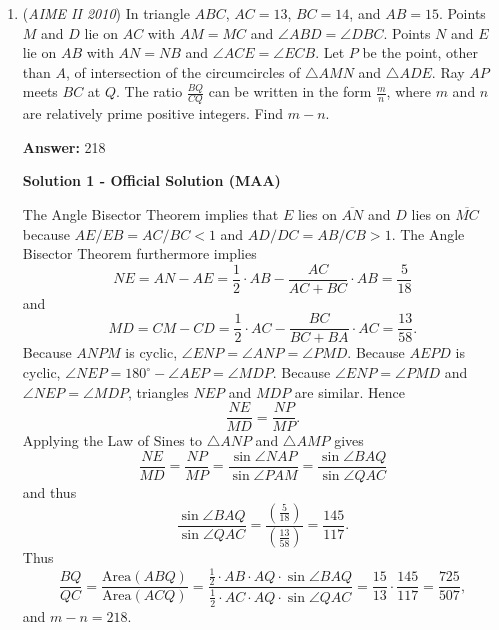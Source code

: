 \begin{enumerate}
 Using the Law of Sines: 
 \[\frac{x}{\sin (4\theta-180)^{\circ}}=\frac{2}{\sin (2\theta)^{\circ}}\]Using trigonometric identies, $\sin (4\theta-180)^{\circ}=-\sin (4\theta)^{\circ}=-2\sin (2\theta)^{\circ}\cos (2\theta)^{\circ}$. Plugging this back into the Law of Sines formula gives us: 
 \[\frac{x}{-2\sin (2\theta)^{\circ}\cos (2\theta)^{\circ}}=\frac{2}{\sin (2\theta)^{\circ}}\]

 \[-4\sin (2\theta)^{\circ}\cos (2\theta)^{\circ}=x\sin (2\theta)^{\circ}\]
 \[-4\cos (2\theta)^{\circ}=x\]
 \[\cos(2\theta)^{\circ}=\frac{-x}4\]

 Next, using the Law of Cosines: 
 \[2^2=1^2+x^2-2\cdot 1\cdot x\cdot \cos (2\theta)^{\circ}\]Substituting $\cos(2\theta)^{\circ}=\frac{-x}4$ gives us:
 \[2^2=1^2+x^2-2\cdot 1\cdot x\cdot \frac{-x}4\]
 \[4=1+x^2+\frac{x^2}{2}\]

 Solving for x gives $x=\sqrt 2$

 Finally: $\frac{\overline{AP}}{\overline{BP}}=\frac{\overline{AO}+\overline{OP}}{\overline{BO}-\overline{OP}}=\frac{2+\sqrt 2}{2-\sqrt 2}=3+2\sqrt2$, which gives us an answer of $3+2+2=\boxed{007}$. ~adyj

 


	\item (\textit{AIME II 2010}) In triangle $ABC$, $AC=13$, $BC=14$, and $AB=15$. Points $M$ and $D$ lie on $AC$ with $AM=MC$ and $\angle ABD = \angle DBC$. Points $N$ and $E$ lie on $AB$ with $AN=NB$ and $\angle ACE = \angle ECB$. Let $P$ be the point, other than $A$, of intersection of the circumcircles of $\triangle AMN$ and $\triangle ADE$. Ray $AP$ meets $BC$ at $Q$. The ratio $\frac{BQ}{CQ}$ can be written in the form $\frac{m}{n}$, where $m$ and $n$ are relatively prime positive integers. Find $m-n$.


 
 \textbf{Answer: }218



\textbf{Solution 1 - Official Solution (MAA)}

The Angle Bisector Theorem implies that $E$ lies on $\overline{AN}$ and $D$ lies on $\overline{MC}$ because $AE/EB = AC/BC < 1$ and $AD/DC = AB/CB > 1$. The Angle Bisector Theorem furthermore implies
 \[NE=AN-AE=\frac 12\cdot AB - \frac{AC}{AC+BC}\cdot AB=\frac 5{18}\]and
 \[MD = CM - CD =  \frac 12\cdot AC - \frac{BC}{BC+BA}\cdot AC = \frac{13}{58}.\]Because $ANPM$ is cyclic, $\angle ENP = \angle ANP = \angle PMD$. Because $AEPD$ is cyclic, $\angle NEP = 180^\circ-\angle AEP = \angle MDP$. Because $\angle ENP =\angle PMD$ and $\angle NEP = \angle MDP$, triangles $NEP$ and $MDP$ are similar. Hence
 \[\frac{NE}{MD}=\frac{NP}{MP}.\]Applying the Law of Sines to $\triangle ANP$ and $\triangle AMP$ gives
 \[\frac{NE}{MD} = \frac{NP}{MP} = \frac{\sin  \angle NAP}{\sin  \angle PAM} = \frac{\sin  \angle BAQ}{\sin  \angle QAC}\]and thus
 \[\frac{\sin  \angle BAQ}{\sin  \angle QAC} = \frac{(\frac{5}{18})}{(\frac{13}{58})} = \frac{145}{117}.\]Thus
 \[\frac{BQ}{QC} = \frac{\textrm{Area}(ABQ)}{\textrm{Area}(ACQ)}  = \frac{\frac{1}{2}\cdot AB \cdot AQ \cdot \sin \angle BAQ}{\frac{1}{2}\cdot AC \cdot AQ \cdot \sin \angle QAC}= \frac{15}{13} \cdot \frac{145}{117} = \frac{725}{507},\]and $m - n = \boxed{218}$.


\end{enumerate}
